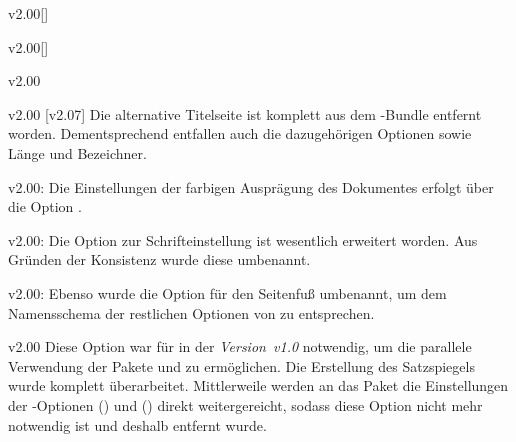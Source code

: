 \NewDocumentCommand{}


%
\begin{Obsolete}{v2.00}[]{}
\begin{Obsolete}{v2.00}[]{}
\begin{Obsolete}{v2.00}{}
\begin{Obsolete}{v2.00}{}
\printobsoletelist%
%
[v2.07]%
Die alternative Titelseite ist komplett aus dem \TUDScript-Bundle entfernt 
worden. Dementsprechend entfallen auch die dazugehörigen Optionen sowie Länge 
und Bezeichner.
\end{Obsolete}
\end{Obsolete}
\end{Obsolete}
\end{Obsolete}

\begin{Obsolete}{v2.00:}{}
\printobsoletelist%
%
Die Einstellungen der farbigen Ausprägung des Dokumentes erfolgt über die 
Option .
\end{Obsolete}

\begin{Obsolete}{v2.00:}{}
\printobsoletelist%
%
Die Option zur Schrifteinstellung ist wesentlich erweitert worden. Aus Gründen 
der Konsistenz wurde diese umbenannt.
\end{Obsolete}

\begin{Obsolete}{v2.00:}{}
\printobsoletelist%
%
Ebenso wurde die Option für den Seitenfuß umbenannt, um dem Namensschema der 
restlichen Optionen von \TUDScript zu entsprechen.
\end{Obsolete}

\begin{Obsolete}{v2.00}{}{%
}
\printobsoletelist%
%
Diese Option war für \TUDScript in der \emph{Version~v1.0} notwendig, um die 
parallele Verwendung der Pakete  und  zu 
ermöglichen. Die Erstellung des Satzspiegels wurde komplett überarbeitet. 
Mittlerweile werden an das Paket  die Einstellungen der 
\KOMAScript-Optionen () und 
() direkt weitergereicht, sodass diese 
Option nicht mehr notwendig ist und deshalb entfernt wurde.
\end{Obsolete}

